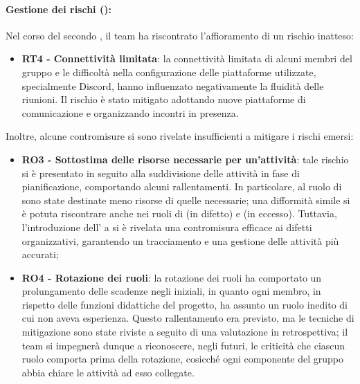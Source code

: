 \paragraph*{Gestione dei rischi ():}
\par Nel corso del secondo , il team ha riscontrato l'affioramento di un rischio inatteso:
\begin{itemize}
  \item \textbf{RT4 - Connettività limitata}: la connettività limitata di alcuni membri del gruppo e le difficoltà nella configurazione delle piattaforme utilizzate, specialmente Discord, hanno influenzato negativamente la fluidità delle riunioni. Il rischio è stato mitigato adottando nuove piattaforme di comunicazione e organizzando incontri in presenza.
\end{itemize}

\par Inoltre, alcune contromisure si sono rivelate insufficienti a mitigare i rischi emersi:
\begin{itemize}
  \item \textbf{RO3 - Sottostima delle risorse necessarie per un'attività}: tale rischio si è presentato in seguito alla suddivisione delle attività in fase di pianificazione, comportando alcuni rallentamenti. In particolare, al ruolo di \Amministratore{} sono state destinate meno risorse di quelle necessarie; una difformità simile si è potuta riscontrare anche nei ruoli di \Programmatore{} (in difetto) e \Progettista{} (in eccesso). Tuttavia, l'introduzione dell'\Amministratore{} a  si è rivelata una contromisura efficace ai difetti organizzativi, garantendo un tracciamento e una gestione delle attività più accurati;
  \item \textbf{RO4 - Rotazione dei ruoli}: la rotazione dei ruoli ha comportato un prolungamento delle scadenze negli  iniziali, in quanto ogni membro, in rispetto delle funzioni didattiche del progetto, ha assunto un ruolo inedito di cui non aveva esperienza. Questo rallentamento era previsto, ma le tecniche di mitigazione sono state riviste a seguito di una valutazione in retrospettiva; il team si impegnerà dunque a riconoscere, negli  futuri, le criticità che ciascun ruolo comporta prima della rotazione, cosicché ogni componente del gruppo abbia chiare le attività ad esso collegate.
\end{itemize}

